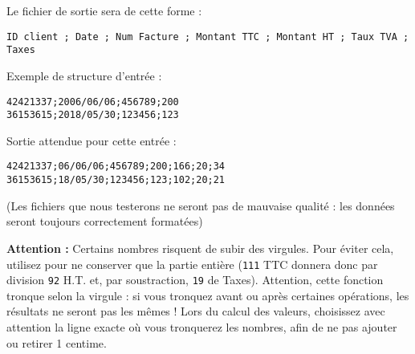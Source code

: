 %
%

\bigskip

\noindent Le fichier de sortie sera de cette forme : \\

\hspace*{-\parindent} %
\begin{minipage}{17cm} %
\lstset{language=sh,basicstyle=\ttfamily \footnotesize}
\begin{lstlisting}[frame=single,title={Sortie attendue}]
ID client ; Date ; Num Facture ; Montant TTC ; Montant HT ; Taux TVA ; Taxes
\end{lstlisting}
\end{minipage} %

\bigskip

\noindent Exemple de structure d'entrée :

\lstset{language=sh}
\begin{lstlisting}[frame=single,title={Exemple de données en entrée}]
42421337;2006/06/06;456789;200
36153615;2018/05/30;123456;123
\end{lstlisting}

\bigskip

\noindent Sortie attendue pour cette entrée :

\lstset{language=sh}
\begin{lstlisting}[frame=single,title={Sortie attendue pour l'entrée précédente}]
42421337;06/06/06;456789;200;166;20;34
36153615;18/05/30;123456;123;102;20;21
\end{lstlisting}

\bigskip

\noindent (Les fichiers que nous testerons ne seront pas de mauvaise qualité : les données seront toujours correctement formatées)

\bigskip

\noindent \textbf{Attention :} Certains nombres risquent de subir des virgules.
Pour éviter cela, utilisez  pour ne conserver que la partie entière (\texttt{111} TTC donnera donc par division \texttt{92} H.T. et, par soustraction, \texttt{19} de Taxes).
Attention, cette fonction tronque selon la virgule : si vous tronquez avant ou après certaines opérations, les résultats ne seront pas les mêmes !
Lors du calcul des valeurs, choisissez avec attention la ligne exacte où vous tronquerez les nombres, afin de ne pas ajouter ou retirer 1 centime.

